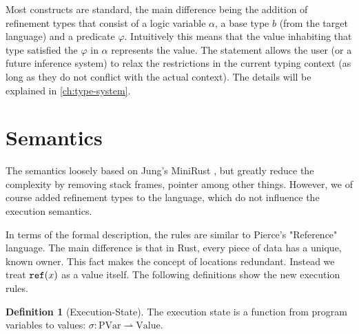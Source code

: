 \documentclass[twoside, english]{sdqthesis}
\theoremstyle{definition}
\newtheorem{definition}[theorem]{Definition}
\begin{document}
Most constructs are standard, the main difference being the addition of refinement types that consist of a logic variable $\alpha$, a base type $b$ (from the target language) and a predicate $\varphi$. Intuitively this means that the value inhabiting that type satisfied the $\varphi$ in $\alpha$ represents the value. 
The statement  allows the user (or a future inference system) to relax the restrictions in the current typing context (as long as they do not conflict with the actual context). The details will be explained in \cref{ch:type-system}.

\section{Semantics}


The semantics loosely based on Jung's MiniRust \cite{jung_minirust_2022}, but greatly reduce the complexity by removing stack frames, pointer among other things.
However, we of course added refinement types to the language, which do not influence the execution semantics.

In terms of the formal description, the rules are similar to Pierce's \cite[p. 166f]{pierce_types_2002-3} "Reference" language. %
The main difference is that in Rust, every piece of data has a unique, known owner. This fact makes the concept of locations redundant. Instead we treat $\code{ref}(x)$ as a value itself. The following definitions show the new execution rules.

\begin{definition}[Execution-State]
  The execution state is a function from program variables to values: $\sigma : \text{PVar} \rightharpoonup \text{Value}$. 
\end{definition}
\end{document}
